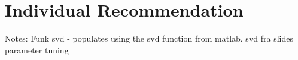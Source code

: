 \section{Individual Recommendation}\label{sec:individual_recommendation}
Notes: 
Funk svd - populates using the svd function from matlab.
svd fra slides
parameter tuning


